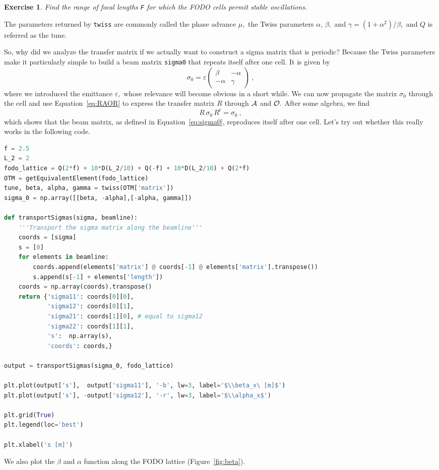 \documentclass{article}
\newtheorem{exercise}{Exercise}
\newcommand\eps{\varepsilon}
\begin{document}
\begin{exercise}
Find the range of focal lengths {\tt F} for which the FODO cells permit stable oscillations.
\end{exercise}

The parameters returned by {\tt twiss} are commonly called the phase advance $\mu,$
the Twiss parameters $\alpha,\,\beta,$ and $\gamma=(1+\alpha^2)/\beta,$ and $Q$ is referred as the tune.
\par
So, why did we analyze the transfer matrix if we actually want to construct a 
sigma matrix that is periodic? Because the Twiss parameters make it particularly
simple to build a beam matrix {\tt sigma0} that repeats itself after one cell.
It is given by
\begin{equation}\label{eq:sigma0}
\sigma_0=\eps \left(\begin{array}{rr} \beta & -\alpha \\ -\alpha & \gamma \end{array}\right)\ ,
\end{equation} 
where we introduced the emittance $\eps,$ whose relevance will become obvious in a short
while. We can now propagate the matrix $\sigma_0$ through the cell and use Equation~\ref{eq:RAOR} 
to express the transfer matrix $R$ through ${\cal A}$ and ${\cal O}.$ After some algebra, we
find
\begin{equation}
R\, \sigma_0\, R^t = \sigma_0\ ,
\end{equation}
which shows that the beam matrix, as defined in Equation~\ref{eq:sigma0}, reproduces itself 
after one cell. Let's try out whether this really works in the following code.

\begin{lstlisting}[language=Python]
f = 2.5
L_2 = 2
fodo_lattice = Q(2*f) + 10*D(L_2/10) + Q(-f) + 10*D(L_2/10) + Q(2*f)
OTM = getEquivalentElement(fodo_lattice)
tune, beta, alpha, gamma = twiss(OTM['matrix'])
sigma_0 = np.array([[beta, -alpha],[-alpha, gamma]])

def transportSigmas(sigma, beamline):
    '''Transport the sigma matrix along the beamline'''
    coords = [sigma]
    s = [0]
    for elements in beamline:
        coords.append(elements['matrix'] @ coords[-1] @ elements['matrix'].transpose())
        s.append(s[-1] + elements['length']) 
    coords = np.array(coords).transpose()
    return {'sigma11': coords[0][0],
            'sigma12': coords[0][1],
            'sigma21': coords[1][0], # equal to sigma12
            'sigma22': coords[1][1],
            's':  np.array(s),
            'coords': coords,}

output = transportSigmas(sigma_0, fodo_lattice)

plt.plot(output['s'],  output['sigma11'], '-b', lw=3, label='$\\beta_x\ [m]$')
plt.plot(output['s'], -output['sigma12'], '-r', lw=3, label='$\\alpha_x$')
    
plt.grid(True)
plt.legend(loc='best')

plt.xlabel('s [m]')
\end{lstlisting}
We also plot the $\beta$ and $\alpha$ function along the FODO lattice (Figure~\ref{fig:beta}).
\end{document}
